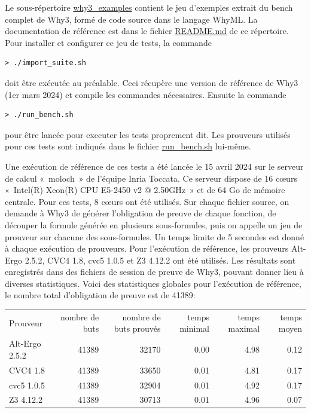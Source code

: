\documentclass[a4paper,11pt]{article}
\begin{document}
Le sous-répertoire \url{why3_examples} contient le jeu d'exemples
extrait du bench complet de Why3, formé de code source dans le langage
WhyML. La documentation de référence est dans le fichier \url{README.md} de ce répertoire.
Pour installer et configurer ce jeu de tests, la commande
\begin{lstlisting}
> ./import_suite.sh
\end{lstlisting}
doit être exécutée au préalable. Ceci récupère une version de
référence de Why3 (1er mars 2024) et compile les commandes nécessaires. Ensuite la commande
\begin{lstlisting}
> ./run_bench.sh
\end{lstlisting}
pour être lancée pour executer les tests proprement dit. Les prouveurs
utilisés pour ces tests sont indiqués dans le fichier
\url{run_bench.sh} lui-même.

Une exécution de référence de ces tests a été lancée le 15 avril 2024
sur le serveur de calcul «~moloch~» de l'équipe Inria Toccata. Ce
serveur dispose de 16 c{\oe}urs «~Intel(R) Xeon(R) CPU E5-2450 v2 @
2.50GHz~» et de 64 Go de mémoire centrale. Pour ces tests, 8 c{\oe}urs
ont été utilisés. Sur chaque fichier source, on demande à Why3 de
générer l'obligation de preuve de chaque fonction, de découper la
formule générée en plusieurs sous-formules, puis on appelle un jeu de
prouveur sur chacune des sous-formules. Un temps limite de 5 secondes est donné à chaque exécution de prouveurs. Pour l'exécution de référence,
les prouveurs Alt-Ergo 2.5.2, CVC4 1.8, cvc5 1.0.5 et Z3 4.12.2 ont
été utilisés. Les résultats sont enregistrés dans des fichiers de
session de preuve de Why3, pouvant donner lieu à diverses
statistiques. Voici des statistiques globales pour l'exécution de
référence, le nombre total d'obligation de preuve est de 41389:
\begin{center}
  \begin{tabular}{|l|r|r|r|r|r|}
    \hline
  \rowcolor{gray!50} Prouveur
  & \multicolumn{1}{p{0.13\textwidth}|}{nombre de buts}
  & \multicolumn{1}{p{0.13\textwidth}|}{nombre de buts prouvés}
  & \multicolumn{1}{p{0.13\textwidth}|}{temps minimal}
  & \multicolumn{1}{p{0.13\textwidth}|}{temps maximal}
  & \multicolumn{1}{p{0.13\textwidth}|}{temps moyen}
  \\
  Alt-Ergo 2.5.2                & 41389 & 32170 &  0.00  & 4.98 &  0.12 \\
  CVC4 1.8                      & 41389 & 33650 &  0.01  & 4.81 &  0.17 \\
  cvc5 1.0.5                    & 41389 & 32904 &  0.01  & 4.92 &  0.17 \\
    Z3 4.12.2                     & 41389 & 30713 &  0.01  & 4.96 &  0.07 \\
    \hline
\end{tabular}
\end{center}
\end{document}
